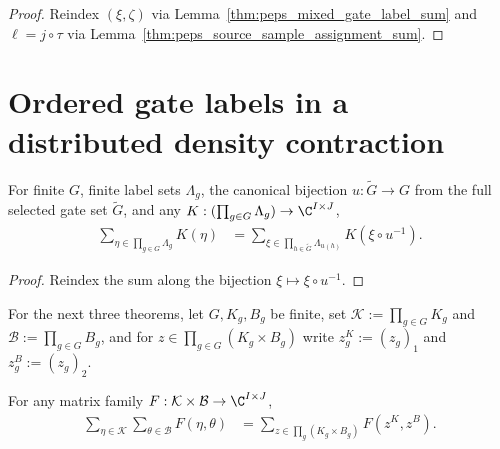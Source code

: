 \begin{proof}
    \leanok
    Reindex $(\xi,\zeta)$ via Lemma~\ref{thm:peps_mixed_gate_label_sum} and $\ell=j\circ\tau$ via Lemma~\ref{thm:peps_source_sample_assignment_sum}.
\end{proof}

\section{Ordered gate labels in a distributed density contraction}
\label{sec:peps_ordered_gate_density_algebra}

\begin{lemma}
    \label{thm:peps_full_selected_gate_label_sum}
    \leanok
    For finite $G$, finite label sets $\Lambda_g$, the canonical bijection $u:\widetilde G\to G$ from the full selected gate set $\widetilde G$, and any $K:(\prod_{g\in G}\Lambda_g)\to\C^{I\times J}$,
    \begin{align}
        \sum_{\eta\in\prod_{g\in G}\Lambda_g}K(\eta)
         & =\sum_{\xi\in\prod_{h\in\widetilde G}\Lambda_{u(h)}}
        K(\xi\circ u^{-1}).
        \label{eq:peps_full_selected_gate_label_sum}
    \end{align}
\end{lemma}

\begin{proof}
    \leanok
    Reindex the sum along the bijection $\xi\mapsto\xi\circ u^{-1}$.
\end{proof}

For the next three theorems, let $G,K_g,B_g$ be finite, set $\mathcal K:=\prod_{g\in G} K_g$ and $\mathcal B:=\prod_{g\in G} B_g$, and for $z\in\prod_{g\in G}(K_g\times B_g)$ write $z^K_g:=(z_g)_1$ and $z^B_g:=(z_g)_2$.

\begin{lemma}
    \label{thm:peps_ordered_gate_label_pair_sum}
    \leanok
    For any matrix family $F:\mathcal K\times\mathcal B\to\C^{I\times J}$,
    \begin{align}
        \sum_{\eta\in\mathcal K}\sum_{\theta\in\mathcal B}F(\eta,\theta)
         & =\sum_{z\in\prod_g(K_g\times B_g)}F(z^K,z^B).
        \label{eq:peps_ordered_gate_label_pair_sum}
    \end{align}
\end{lemma}

